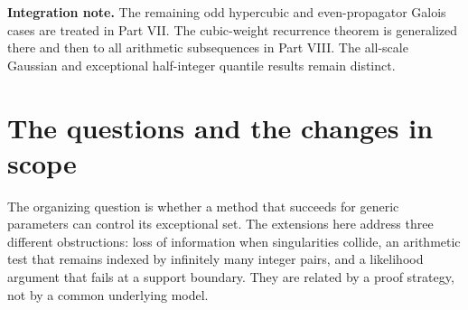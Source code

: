 \documentclass[11pt,a4paper]{article}
\theoremstyle{definition}
\theoremstyle{remark}
\numberwithin{equation}{section}
\begin{document}
\begin{abstract}
We develop six extensions of earlier proof methods, with explicit
attention to exceptional parameters. For anisotropic hypercubic periods,
the connected differential Galois group in dimension three is exactly
$\mathrm{SO}_3$, $\mathrm{SO}_4$, or $\mathrm{SO}_5$, according to the
multiplicities of the squared weights. In every even dimension the
full group is symplectic for every nonzero complex weight tuple.
A unique extremal exponential factor supplies a transvection even when
other thresholds collide; the same argument removes the threshold
restriction from the odd-propagator banana Galois theorem, using the
previously established all-mass order theorem. In arithmetic, we give
a closed classification of algebraic quantiles at algebraic probability
levels for every strict half-integer beta distribution. A prime-denominator
obstruction eliminates all but finitely many shape rows. For cubic
weighted binomial sums, local monodromy rank retains the multiplicity
of colliding singularities and proves the minimum recurrence width for
every nonzero complex weight. Finally, the ordinary constrained Gaussian
mixture NPMLE is minimax, up to universal constants, simultaneously for
all sample sizes, support radii, and noise scales. A boundary posterior
drift estimate joins the small-support Hermite regime to the
large-support transport regime. Proofs, supporting estimates, and the
precise dependencies on preceding work are included.
\end{abstract}

\noindent\textbf{Integration note.} The remaining odd hypercubic and even-propagator Galois cases are treated in Part VII. The cubic-weight recurrence theorem is generalized there and then to all arithmetic subsequences in Part VIII. The all-scale Gaussian and exceptional half-integer quantile results remain distinct.
\clearpage

\section{The questions and the changes in scope}
\label{p6:front:scope}

The organizing question is whether a method that succeeds for generic
parameters can control its exceptional set. The extensions here address
three different obstructions: loss of information when singularities
collide, an arithmetic test that remains indexed by infinitely many
integer pairs, and a likelihood argument that fails at a support boundary.
They are related by a proof strategy, not by a common underlying model.
\end{document}
